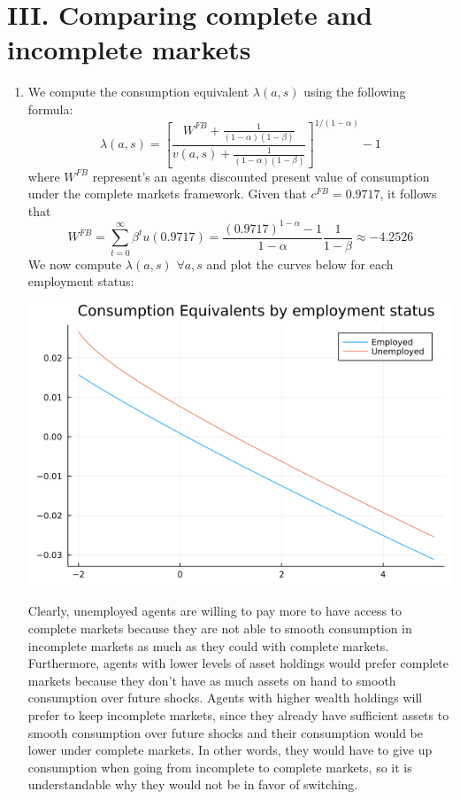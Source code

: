 \documentclass[12pt]{article}
\begin{document}
\section{III. Comparing complete and incomplete markets}
    \begin{enumerate}[label=\alph*) ]
        \item We compute the consumption equivalent $\lambda(a, s)$ using the following formula:
        \[\lambda(a,s) = \left[ \frac{W^{FB} + \frac{1}{(1-\alpha)(1-\beta)}}{v(a,s) + \frac{1}{(1-\alpha)(1-\beta)}}\right]^{1/(1-\alpha)} -1\]
        where $W^{FB}$ represent's an agents discounted present value of consumption under the complete markets framework. Given that $c^{FB} = 0.9717$, it follows that
        \[W^{FB} = \sum_{t=0}^{\infty} \beta^t u(0.9717) = \frac{(0.9717)^{1-\alpha} -1}{1-\alpha} \frac{1}{1-\beta} \approx -4.2526\]
        We now compute $\lambda(a,s)$ $\forall a,s$ and plot the curves below for each employment status:
        \begin{center}
            \includegraphics[scale=0.5]{lambdaplot.png}
        \end{center}
        Clearly, unemployed agents are willing to pay more to have access to complete markets because they are not able to smooth consumption in incomplete markets as much as they could with complete markets. Furthermore, agents with lower levels of asset holdings would prefer complete markets because they don't have as much assets on hand to smooth consumption over future shocks. Agents with higher wealth holdings will prefer to keep incomplete markets, since they already have sufficient assets to smooth consumption over future shocks and their consumption would be lower under complete markets. In other words, they would have to give up consumption when going from incomplete to complete markets, so it is understandable why they would not be in favor of switching.

\end{enumerate}
\end{document}
